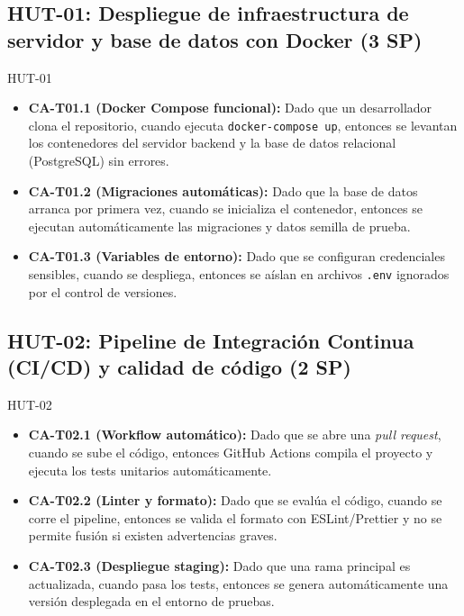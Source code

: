 \documentclass[11pt,a4paper]{article}
\newcommand{\ca}[2]{\item \textbf{#1:} #2}
\begin{document}
\subsection{HUT-01: Despliegue de infraestructura de servidor y base de datos con Docker (3 SP)}
\begin{criterios}{HUT-01}
\begin{itemize}
\ca{CA-T01.1 (Docker Compose funcional)}{Dado que un desarrollador clona el repositorio, cuando ejecuta \texttt{docker-compose up}, entonces se levantan los contenedores del servidor backend y la base de datos relacional (PostgreSQL) sin errores.}
\ca{CA-T01.2 (Migraciones automáticas)}{Dado que la base de datos arranca por primera vez, cuando se inicializa el contenedor, entonces se ejecutan automáticamente las migraciones y datos semilla de prueba.}
\ca{CA-T01.3 (Variables de entorno)}{Dado que se configuran credenciales sensibles, cuando se despliega, entonces se aíslan en archivos \texttt{.env} ignorados por el control de versiones.}
\end{itemize}
\end{criterios}

\subsection{HUT-02: Pipeline de Integración Continua (CI/CD) y calidad de código (2 SP)}
\begin{criterios}{HUT-02}
\begin{itemize}
\ca{CA-T02.1 (Workflow automático)}{Dado que se abre una \textit{pull request}, cuando se sube el código, entonces GitHub Actions compila el proyecto y ejecuta los tests unitarios automáticamente.}
\ca{CA-T02.2 (Linter y formato)}{Dado que se evalúa el código, cuando se corre el pipeline, entonces se valida el formato con ESLint/Prettier y no se permite fusión si existen advertencias graves.}
\ca{CA-T02.3 (Despliegue staging)}{Dado que una rama principal es actualizada, cuando pasa los tests, entonces se genera automáticamente una versión desplegada en el entorno de pruebas.}
\end{itemize}
\end{criterios}
\end{document}
